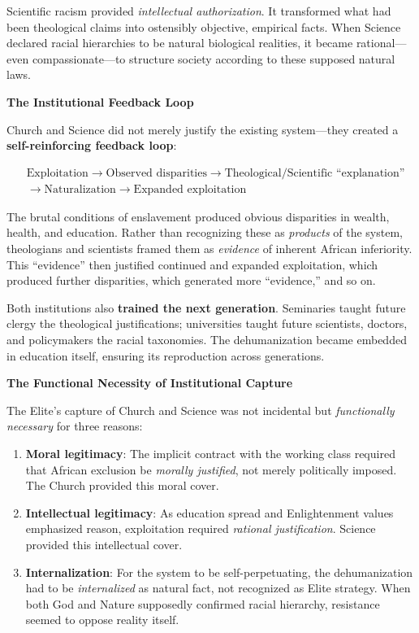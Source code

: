 \documentclass[12pt]{article}
\begin{document}
Scientific racism provided \textit{intellectual authorization}. It transformed what had been theological claims into ostensibly objective, empirical facts. When Science declared racial hierarchies to be natural biological realities, it became rational---even compassionate---to structure society according to these supposed natural laws.

\textbf{The Institutional Feedback Loop}

Church and Science did not merely justify the existing system---they created a \textbf{self-reinforcing feedback loop}:

\[
\begin{aligned}
&\text{Exploitation} \rightarrow \text{Observed disparities} \rightarrow \text{Theological/Scientific ``explanation''} \\
&\rightarrow \text{Naturalization} \rightarrow \text{Expanded exploitation}
\end{aligned}
\]

The brutal conditions of enslavement produced obvious disparities in wealth, health, and education. Rather than recognizing these as \textit{products} of the system, theologians and scientists framed them as \textit{evidence} of inherent African inferiority. This ``evidence'' then justified continued and expanded exploitation, which produced further disparities, which generated more ``evidence,'' and so on.

Both institutions also \textbf{trained the next generation}. Seminaries taught future clergy the theological justifications; universities taught future scientists, doctors, and policymakers the racial taxonomies. The dehumanization became embedded in education itself, ensuring its reproduction across generations.

\textbf{The Functional Necessity of Institutional Capture}

The Elite's capture of Church and Science was not incidental but \textit{functionally necessary} for three reasons:

\begin{enumerate}
    \item \textbf{Moral legitimacy}: The implicit contract with the working class required that African exclusion be \textit{morally justified}, not merely politically imposed. The Church provided this moral cover.
    
    \item \textbf{Intellectual legitimacy}: As education spread and Enlightenment values emphasized reason, exploitation required \textit{rational justification}. Science provided this intellectual cover.
    
    \item \textbf{Internalization}: For the system to be self-perpetuating, the dehumanization had to be \textit{internalized} as natural fact, not recognized as Elite strategy. When both God and Nature supposedly confirmed racial hierarchy, resistance seemed to oppose reality itself.
\end{enumerate}
\end{document}
